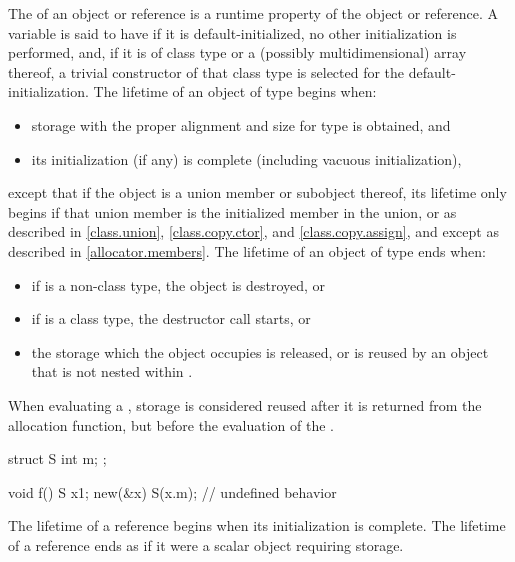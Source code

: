 \pnum
{}%
The  of an object or reference is a runtime property of the
object or reference.
A variable is said to have 
if it is default-initialized, no other initialization is performed, and,
if it is of class type or a (possibly multidimensional) array thereof,
a trivial constructor of that class type is selected for
the default-initialization.
The lifetime of an object of type  begins when:
\begin{itemize}
\item storage with the proper alignment and size
  for type  is obtained, and
\item its initialization (if any) is complete
  (including vacuous initialization),
\end{itemize}
except that if the object is a union member or subobject thereof,
its lifetime only begins if that union member is the
initialized member in the union,
or as described in
\ref{class.union}, \ref{class.copy.ctor}, and \ref{class.copy.assign},
and except as described in \ref{allocator.members}.
The lifetime of an object  of type  ends when:
\begin{itemize}
\item if  is a non-class type, the object is destroyed, or
\item if  is a class type, the destructor call starts, or
\item the storage which the object occupies is released,
or is reused by an object that is not nested within .
\end{itemize}
When evaluating a ,
storage is considered reused after it is returned from the allocation function,
but before the evaluation of the .
\begin{example}
\begin{codeblock}
struct S {
  int m;
};

void f() {
  S x{1};
  new(&x) S(x.m);   // undefined behavior
}
\end{codeblock}
\end{example}

\pnum
{}%
The lifetime of a reference begins when its initialization is complete.
The lifetime of a reference ends as if it were a scalar object requiring storage.

